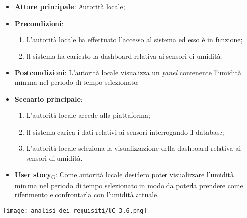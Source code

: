 \begin{itemize}
	\item \textbf{Attore principale}: Autorità locale;
	\item \textbf{Precondizioni}:
	      \begin{enumerate}
		      \item L'autorità locale ha effettuato l'accesso al sistema ed esso è in funzione;
		      \item Il sistema ha caricato la dashboard relativa ai sensori di umidità;
	      \end{enumerate}
	\item \textbf{Postcondizioni}: L'autorità locale visualizza un \textit{panel} contenente l'umidità minima nel periodo di tempo selezionato;
	\item \textbf{Scenario principale}:
	      \begin{enumerate}
		      \item L'autorità locale accede alla piattaforma;
		      \item Il sistema carica i dati relativi ai sensori interrogando il database;
		      \item L'autorità locale seleziona la visualizzazione della dashboard relativa ai sensori di umidità.
	      \end{enumerate}
	\item \href{https://7last.github.io/docs/rtb/documentazione-interna/glossario\#user-story}{\textbf{User story}\textsubscript{G}}:
	      Come autorità locale desidero poter visualizzare l'umidità minima nel periodo di tempo selezionato
	      in modo da poterla prendere come riferimento e confrontarla con l'umidità attuale.
\end{itemize}
\begin{center}
	\texttt{[image: analisi\_dei\_requisiti/UC-3.6.png]}
\end{center}


